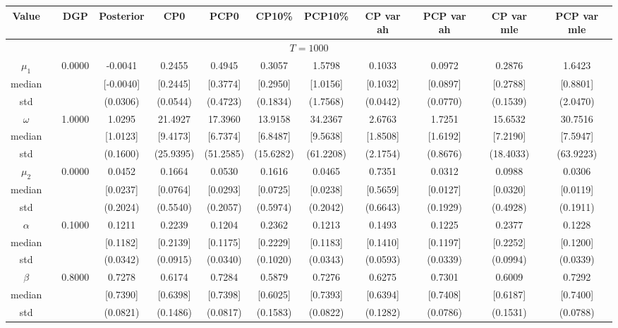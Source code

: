 { \renewcommand{\arraystretch}{1.2} 
\begin{sidewaystable} 
\center 
\begin{tabular}{cc cc cccc cccc} 
Value && DGP & Posterior & CP0  & PCP0 & CP10\%  & PCP10\% &CP var ah & PCP var ah & CP var mle & PCP var mle \\ \hline 
\hline 
\multicolumn{12}{c}{$T =1000$}  \\ 
\hline 
$\mu_{1}$&& 0.0000 & -0.0041 & 0.2455 & 0.4945 & 0.3057 & 1.5798 & 0.1033 & 0.0972 & 0.2876 & 1.6423  \\ 
median &&  & [-0.0040] & [0.2445] & [0.3774] & [0.2950] & [1.0156] & [0.1032] & [0.0897] & [0.2788] & [0.8801]  \\ 
std &&   & (0.0306) & (0.0544) & (0.4723) & (0.1834) & (1.7568) &(0.0442) & (0.0770) & (0.1539) & (2.0470)  \\ 
$\omega$&& 1.0000 & 1.0295 & 21.4927 & 17.3960 & 13.9158 & 34.2367 & 2.6763 & 1.7251 & 15.6532 & 30.7516  \\ 
median &&  & [1.0123] & [9.4173] & [6.7374] & [6.8487] & [9.5638] & [1.8508] & [1.6192] & [7.2190] & [7.5947]  \\ 
std &&   & (0.1600) & (25.9395) & (51.2585) & (15.6282) & (61.2208) &(2.1754) & (0.8676) & (18.4033) & (63.9223)  \\ 
$\mu_{2}$&& 0.0000 & 0.0452 & 0.1664 & 0.0530 & 0.1616 & 0.0465 & 0.7351 & 0.0312 & 0.0988 & 0.0306  \\ 
median &&  & [0.0237] & [0.0764] & [0.0293] & [0.0725] & [0.0238] & [0.5659] & [0.0127] & [0.0320] & [0.0119]  \\ 
std &&   & (0.2024) & (0.5540) & (0.2057) & (0.5974) & (0.2042) &(0.6643) & (0.1929) & (0.4928) & (0.1911)  \\ 
$\alpha$&& 0.1000 & 0.1211 & 0.2239 & 0.1204 & 0.2362 & 0.1213 & 0.1493 & 0.1225 & 0.2377 & 0.1228  \\ 
median &&  & [0.1182] & [0.2139] & [0.1175] & [0.2229] & [0.1183] & [0.1410] & [0.1197] & [0.2252] & [0.1200]  \\ 
std &&   & (0.0342) & (0.0915) & (0.0340) & (0.1020) & (0.0343) &(0.0593) & (0.0339) & (0.0994) & (0.0339)  \\ 
$\beta$&& 0.8000 & 0.7278 & 0.6174 & 0.7284 & 0.5879 & 0.7276 & 0.6275 & 0.7301 & 0.6009 & 0.7292  \\ 
median &&  & [0.7390] & [0.6398] & [0.7398] & [0.6025] & [0.7393] & [0.6394] & [0.7408] & [0.6187] & [0.7400]  \\ 
std &&   & (0.0821) & (0.1486) & (0.0817) & (0.1583) & (0.0822) &(0.1282) & (0.0786) & (0.1531) & (0.0788)  \\ 

\end{tabular}
\end{sidewaystable}}
